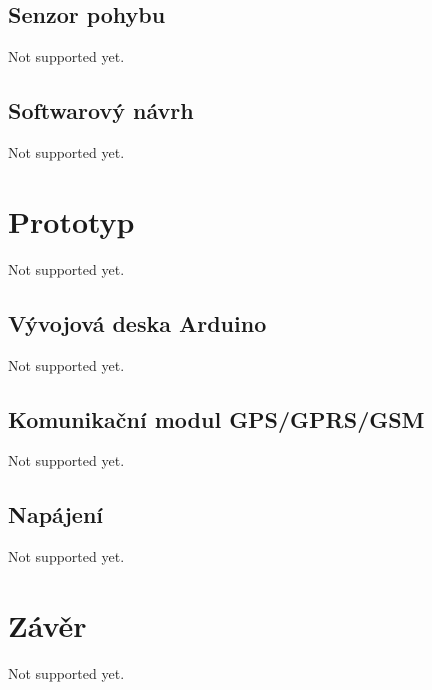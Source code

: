 \documentclass[FM,BP]{tulthesis}
\begin{document}
\section{Senzor pohybu}
Not supported yet.

\section{Softwarový návrh}
Not supported yet.

\chapter{Prototyp}
Not supported yet.

\section{Vývojová deska Arduino}
Not supported yet.

\section{Komunikační modul GPS/GPRS/GSM}
Not supported yet.

\section{Napájení}
Not supported yet.

\chapter{Závěr}
Not supported yet.
\end{document}
